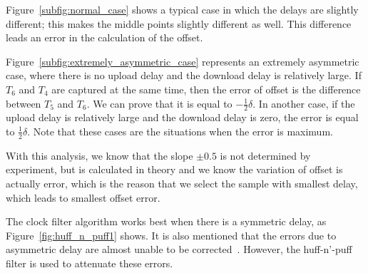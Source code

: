 

Figure~\ref{subfig:normal_case} shows a typical case in which the delays are
slightly different; this makes the middle points slightly different as well.
This difference leads an error in the calculation of the offset.

Figure~\ref{subfig:extremely_asymmetric_case} represents an extremely
asymmetric case, where there is no upload delay and the download delay is
relatively large. If $T_6$ and $T_4$ are captured at the same time, then the
error of offset is the difference between $T_5$ and $T_6$. We can prove that it
is equal to $-\frac{1}{2}\delta$. In another case, if the upload delay is
relatively large and the download delay is zero, the error is equal to
$\frac{1}{2}\delta$. Note that these cases are the situations when the error is
maximum.

With this analysis, we know that the slope $\pm0.5$ is not determined by
experiment, but is calculated in theory and we know the variation of offset is
actually error, which is the reason that we select the sample with smallest
delay, which leads to smallest offset error.

The clock filter algorithm works best when there is a symmetric delay, as
Figure~\ref{fig:huff_n_puff1} shows. It is also mentioned that the errors due
to asymmetric delay are almost unable to be corrected~\cite{redbook}. However,
the huff-n'-puff filter is used to attenuate these errors.

